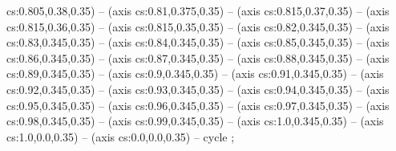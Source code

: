 cs:0.805,0.38,0.35) -- (axis cs:0.81,0.375,0.35) -- (axis cs:0.815,0.37,0.35) -- (axis cs:0.815,0.36,0.35) -- (axis cs:0.815,0.35,0.35) -- (axis cs:0.82,0.345,0.35) -- (axis cs:0.83,0.345,0.35) -- (axis cs:0.84,0.345,0.35) -- (axis cs:0.85,0.345,0.35) -- (axis cs:0.86,0.345,0.35) -- (axis cs:0.87,0.345,0.35) -- (axis cs:0.88,0.345,0.35) -- (axis cs:0.89,0.345,0.35) -- (axis cs:0.9,0.345,0.35) -- (axis cs:0.91,0.345,0.35) -- (axis cs:0.92,0.345,0.35) -- (axis cs:0.93,0.345,0.35) -- (axis cs:0.94,0.345,0.35) -- (axis cs:0.95,0.345,0.35) -- (axis cs:0.96,0.345,0.35) -- (axis cs:0.97,0.345,0.35) -- (axis cs:0.98,0.345,0.35) -- (axis cs:0.99,0.345,0.35) -- (axis cs:1.0,0.345,0.35) -- (axis cs:1.0,0.0,0.35) -- (axis cs:0.0,0.0,0.35) -- cycle
;
